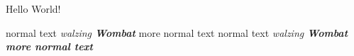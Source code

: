 \documentclass[a4paper,12pt]{article}
\begin{document}
  Hello World!



  normal text {\itshape walzing \bfseries Wombat} more normal text
  normal text \bgroup\itshape walzing \bfseries Wombat\egroup{} more normal text
\end{document}
